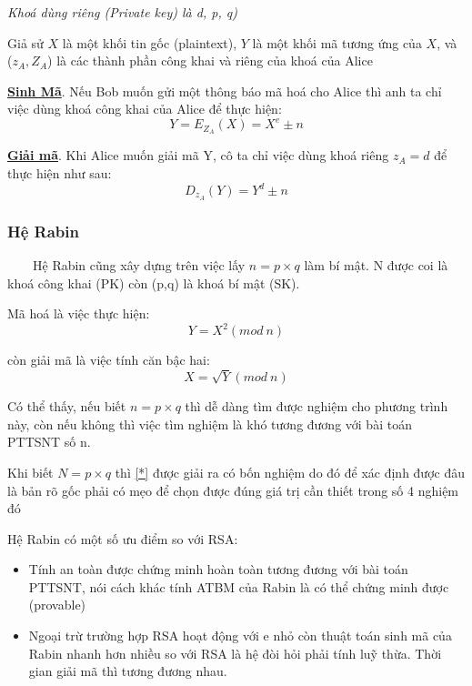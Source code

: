\documentclass[a4paper,12pt]{report}
\begin{document}
\textit{Khoá dùng riêng (Private key) là d, p, q)}

Giả sử $X$ là một khối tin gốc (plaintext), $Y$ là một khối mã tương ứng của $X$, và ($z_A, Z_A$) là các thành phần công khai và riêng của khoá của Alice

\textbf{\underline{Sinh Mã}}. Nếu Bob muốn gửi một thông báo mã hoá cho Alice thì anh ta chỉ việc dùng khoá công khai của Alice để thực hiện:
\begin{displaymath}
Y = E_{Z_A}(X) = X^e \pm n
\end{displaymath}

\textbf{\underline{Giải mã}}. Khi Alice muốn giải mã Y, cô ta chỉ việc dùng khoá riêng $z_A = d$ để thực hiện như sau:
\begin{displaymath}
D_{z_A}(Y) = Y^d \pm n
\end{displaymath}
\subsubsection{Hệ Rabin}
\ \ \ \ Hệ Rabin cũng xây dựng trên việc lấy $n=p\times q$ làm bí mật. N được coi là khoá công khai (PK) còn (p,q) là khoá bí mật (SK).

Mã hoá là việc thực hiện:
\begin{displaymath}
Y = X^2 (mod \ n)
\end{displaymath}

còn giải mã là việc tính căn bậc hai:
\begin{equation}
X = \sqrt{Y} (mod \ n)  \label{*} 
\end{equation}

Có thể thấy, nếu biết $n=p\times q$ thì dễ dàng tìm được nghiệm cho phương trình này, còn nếu không thì việc tìm nghiệm là khó tương đương với bài toán PTTSNT số n.

Khi biết $N=p\times q$ thì \ref{*} được giải ra có bốn nghiệm do đó để xác định được đâu là bản rõ gốc phải có mẹo để chọn được đúng giá trị cần thiết trong số 4 nghiệm đó

Hệ Rabin có một số ưu điểm so với RSA:
\begin{itemize}
\item Tính an toàn được chứng minh hoàn toàn tương đương với bài toán PTTSNT, nói cách khác tính ATBM của Rabin là có thể chứng minh  được (provable)
\item Ngoại trừ trường hợp RSA hoạt động với e nhỏ còn thuật toán sinh mã của Rabin nhanh hơn nhiều so với RSA là hệ đòi hỏi phải tính luỹ thừa. Thời gian giải mã thì
tương đương nhau.
\end{itemize}
\end{document}
